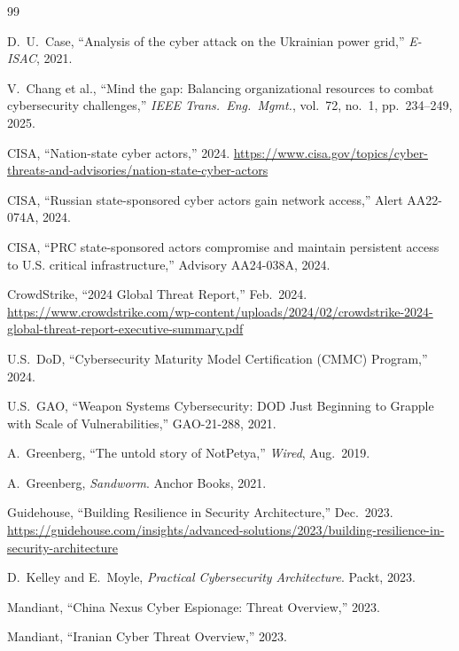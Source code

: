 \documentclass[sigconf,nonacm]{acmart}
\begin{document}
\sloppy

\begin{thebibliography}{99}

D.~U.~Case, ``Analysis of the cyber attack on the Ukrainian power grid,''
\textit{E-ISAC}, 2021.

V.~Chang et al., ``Mind the gap: Balancing organizational resources to combat
cybersecurity challenges,'' \textit{IEEE Trans.\ Eng.\ Mgmt.}, vol.~72, no.~1,
pp.~234--249, 2025.

CISA, ``Nation-state cyber actors,'' 2024.
\url{https://www.cisa.gov/topics/cyber-threats-and-advisories/nation-state-cyber-actors}

CISA, ``Russian state-sponsored cyber actors gain network access,'' Alert AA22-074A, 2024.

CISA, ``PRC state-sponsored actors compromise and maintain persistent access to U.S.
critical infrastructure,'' Advisory AA24-038A, 2024.

CrowdStrike, ``2024 Global Threat Report,'' Feb.~2024.
\url{https://www.crowdstrike.com/wp-content/uploads/2024/02/crowdstrike-2024-global-threat-report-executive-summary.pdf}

U.S.\ DoD, ``Cybersecurity Maturity Model Certification (CMMC) Program,'' 2024.

U.S.\ GAO, ``Weapon Systems Cybersecurity: DOD Just Beginning to Grapple with Scale of
Vulnerabilities,'' GAO-21-288, 2021.

A.~Greenberg, ``The untold story of NotPetya,'' \textit{Wired}, Aug.~2019.

A.~Greenberg, \textit{Sandworm}. Anchor Books, 2021.

Guidehouse, ``Building Resilience in Security Architecture,'' Dec.~2023.
\url{https://guidehouse.com/insights/advanced-solutions/2023/building-resilience-in-security-architecture}

D.~Kelley and E.~Moyle, \textit{Practical Cybersecurity Architecture}. Packt, 2023.

Mandiant, ``China Nexus Cyber Espionage: Threat Overview,'' 2023.

Mandiant, ``Iranian Cyber Threat Overview,'' 2023.


\end{thebibliography}
\end{document}

